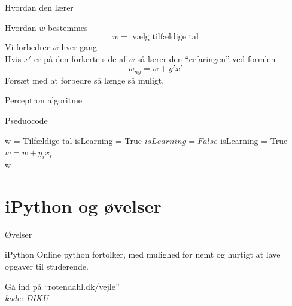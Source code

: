 \documentclass[12pt,t]{beamer}
\begin{document}
    \begin{frame}[c]{Hvordan den lærer}
        \begin{block}{Hvordan $w$ bestemmes}
            $$w = \text{ vælg tilfældige tal}$$
            \pause
            Vi forbedrer $w$ hver gang\\ \pause
            Hvis $x'$ er på den forkerte side af $w$ så lærer den ``erfaringen''
            ved formlen \pause
            $$
                w_{ny} = w + y' x'
            $$
            \pause
            Forsæt med at forbedre så længe så muligt.
        \end{block}
    \end{frame}


    \begin{frame}[plain]{Perceptron algoritme}
        \begin{block}{Pseduocode}
        \vspace{-1em}
        \begin{algorithm}[H]
            \begin{algorithmic}
                \State w = Tilfældige tal
                \State isLearning = True
                \State $isLearning = False$
                        \State isLearning = True
                        \State $w = w + y_i x_i$
                    \EndIf
                \EndFor
                \EndWhile \\
                \Return w
            \end{algorithmic}
        \end{algorithm}
        \end{block}
    \end{frame}

\section{iPython og øvelser}
    \begin{frame}[t]{Øvelser}
        \begin{block}{iPython}
            Online python fortolker, med mulighed for nemt og hurtigt at lave
            opgaver til studerende. \\ \pause

            Gå ind på ``rotendahl.dk/vejle'' \\
            \emph{kode:\alert{ DIKU}}
            \end{block}
    \end{frame}
\end{document}
